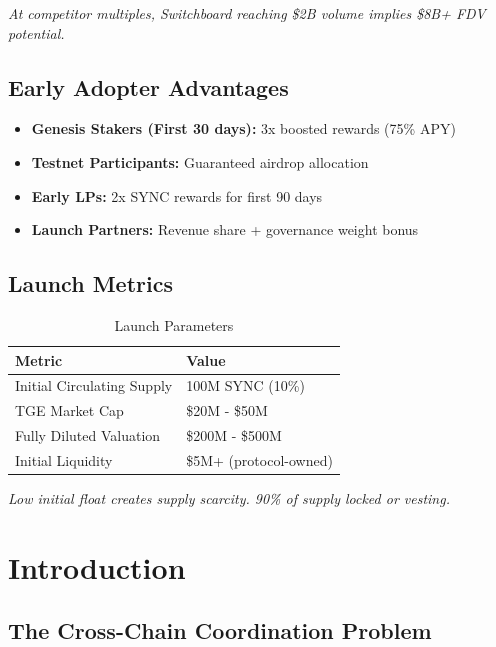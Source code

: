 \documentclass[12pt,a4paper]{article}
\begin{document}
\textit{At competitor multiples, Switchboard reaching \$2B volume implies \$8B+ FDV potential.}

\subsection{Early Adopter Advantages}

\begin{itemize}
    \item \textbf{Genesis Stakers (First 30 days):} 3x boosted rewards (75\% APY)
    \item \textbf{Testnet Participants:} Guaranteed airdrop allocation
    \item \textbf{Early LPs:} 2x SYNC rewards for first 90 days
    \item \textbf{Launch Partners:} Revenue share + governance weight bonus
\end{itemize}

\subsection{Launch Metrics}

\begin{table}[h]
\centering
\begin{tabular}{ll}
\toprule
\textbf{Metric} & \textbf{Value} \\
\midrule
Initial Circulating Supply & 100M SYNC (10\%) \\
TGE Market Cap & \$20M - \$50M \\
Fully Diluted Valuation & \$200M - \$500M \\
Initial Liquidity & \$5M+ (protocol-owned) \\
\bottomrule
\end{tabular}
\caption{Launch Parameters}
\end{table}

\textit{Low initial float creates supply scarcity. 90\% of supply locked or vesting.}

\section{Introduction}

\subsection{The Cross-Chain Coordination Problem}
\end{document}
